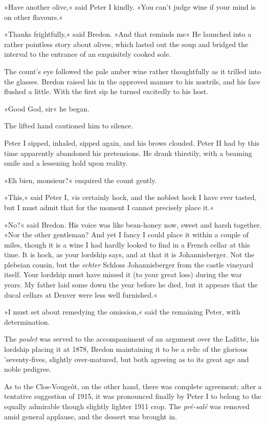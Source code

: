 »Have another olive,« said Peter I kindly. »You can't judge wine if your mind is on other flavours.«

»Thanks frightfully,« said Bredon. »And that reminds me\longdash« He launched into a rather pointless story about olives, which lasted out the soup and bridged the interval to the entrance of an exquisitely cooked sole.

The count's eye followed the pale amber wine rather thoughtfully as it trilled into the glasses. Bredon raised his in the approved manner to his nostrils, and his face flushed a little. With the first sip he turned excitedly to his host.

»Good God, sir\longdash« he began.

The lifted hand cautioned him to silence.

Peter I sipped, inhaled, sipped again, and his brows clouded. Peter II had by this time apparently abandoned his pretensions. He drank thirstily, with a beaming smile and a lessening hold upon reality.

»Eh bien, monsieur?« enquired the count gently.

»This,« said Peter I, »is certainly hock, and the noblest hock I have ever tasted, but I must admit that for the moment I cannot precisely place it.«

»No?« said Bredon. His voice was like bean-honey now, sweet and harsh together. »Nor the other gentleman? And yet I fancy I could place it within a couple of miles, though it is a wine I had hardly looked to find in a French cellar at this time. It is hock, as your lordship says, and at that it is Johannisberger. Not the plebeian cousin, but the \textit{echter} Schloss Johannisberger from the castle vineyard itself. Your lordship must have missed it (to your great loss) during the war years. My father laid some down the year before he died, but it appears that the ducal cellars at Denver were less well furnished.«

»I must set about remedying the omission,« said the remaining Peter, with determination.

The \textit{poulet} was served to the accompaniment of an argument over the Lafitte, his lordship placing it at 1878, Bredon maintaining it to be a relic of the glorious 'seventy-fives, slightly over-matured, but both agreeing as to its great age and noble pedigree.

As to the Clos-Vougeôt, on the other hand, there was complete agreement; after a tentative suggestion of 1915, it was pronounced finally by Peter I to belong to the equally admirable though slightly lighter 1911 crop. The \textit{pré-salé} was removed amid general applause, and the dessert was brought in.

